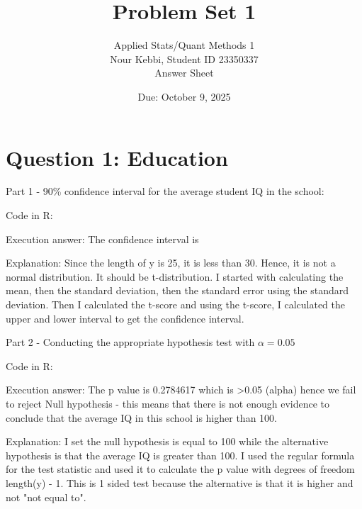 \documentclass[12pt,letterpaper]{article}
\title{Problem Set 1}
\date{Due: October 9, 2025}
\author{Applied Stats/Quant Methods 1 \\ Nour Kebbi, Student ID 23350337 \\ Answer Sheet}
\begin{document}
	\maketitle
	
	\section*{Question 1: Education}


	Part 1 - 90\% confidence interval for the average student IQ in the school: \\
\vspace{.5cm}
\begin{description}
\item Code in R:
  

\item Execution answer: The confidence interval is 

\item Explanation: Since the length of y is 25, it is less than 30. Hence, it is not a normal distribution. It should be t-distribution. I started with calculating the mean, then the standard deviation, then the standard error using the standard deviation. Then I calculated the t-score and using the t-score, I calculated the upper and lower interval to get the confidence interval.
\end{description}
\vspace{1cm}

\newpage

Part 2 - Conducting the appropriate hypothesis test with $\alpha=0.05$
\vspace{.5cm}
\begin{description}
\item Code in R:
  

\item Execution answer: The p value is 0.2784617 which is >0.05 (alpha) hence we fail to reject Null hypothesis - this means that there is not enough evidence to conclude that the average IQ in this school is higher than 100.


\item Explanation: I set the null hypothesis is equal to 100 while the alternative hypothesis is that the average IQ is greater than 100. I used the regular formula for the test statistic and used it to calculate the p value with degrees of freedom length(y) - 1. This is 1 sided test because the alternative is that it is higher and not "not equal to".
\end{description}
\vspace{1cm}
\end{document}
